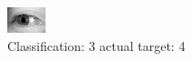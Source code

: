 \begin{figure}[h!]
\begin{center}
\includegraphics[width=0.60\columnwidth]{figures/ID3252_class_3_target_4.png}
\end{center}
\caption{ Classification: 3 actual target: 4}
\label{fig:ID3252_class_3_target_4}
\end{figure}
